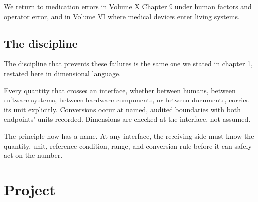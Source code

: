 We return to medication errors in Volume X Chapter 9 under human
factors and operator error, and in Volume VI where medical devices
enter living systems.

\subsection{The discipline}

The discipline that prevents these failures is the same one we stated
in chapter 1, restated here in dimensional language.

\begin{principle}
Every quantity that crosses an interface, whether between humans,
between software systems, between hardware components, or between
documents, carries its unit explicitly. Conversions occur at named,
audited boundaries with both endpoints' units recorded. Dimensions
are checked at the interface, not assumed.
\end{principle}

The principle now has a name. At any interface, the receiving side
must know the quantity, unit, reference condition, range, and
conversion rule before it can safely act on the number.

\section{Project}

